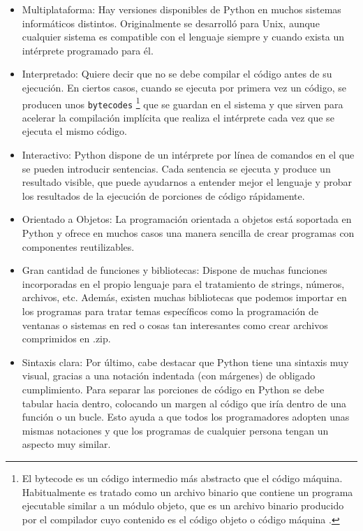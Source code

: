 \documentclass[a4paper, 12pt]{book}
\begin{document}
\begin{itemize}
\item Multiplataforma: Hay versiones disponibles de Python en muchos sistemas informáticos distintos. Originalmente se desarrolló para Unix, aunque cualquier sistema es compatible con el lenguaje siempre y cuando exista un intérprete programado para él.

\item Interpretado: Quiere decir que no se debe compilar el código antes de su ejecución. En ciertos casos, cuando se ejecuta por primera vez un código, se producen unos \texttt{bytecodes} 
\footnote{El bytecode es un código intermedio más abstracto que el código máquina. Habitualmente es tratado como un archivo binario que contiene un programa ejecutable similar a un módulo objeto, que es un archivo binario producido por el compilador cuyo contenido es el código objeto o código máquina .} que se guardan en el sistema y que sirven para acelerar la compilación implícita que realiza el intérprete cada vez que se ejecuta el mismo código.

\item Interactivo: Python dispone de un intérprete por línea de comandos en el que se pueden introducir sentencias. Cada sentencia se ejecuta y produce un resultado visible, que puede ayudarnos a entender mejor el lenguaje y probar los resultados de la ejecución de porciones de código rápidamente.

\item Orientado a Objetos: La programación orientada a objetos está soportada en Python y ofrece en muchos casos una manera sencilla de crear programas con componentes reutilizables.

\item Gran cantidad de funciones y bibliotecas: Dispone de muchas funciones incorporadas en el propio lenguaje para el tratamiento de strings, números, archivos, etc. Además, existen muchas bibliotecas que podemos importar en los programas para tratar temas específicos como la programación de ventanas o sistemas en red o cosas tan interesantes como crear archivos comprimidos en .zip.

\item Sintaxis clara: Por último, cabe destacar que Python tiene una sintaxis muy visual, gracias a una notación indentada (con márgenes) de obligado cumplimiento. Para separar las porciones de código en Python se debe tabular hacia dentro, colocando un margen al código que iría dentro de una función o un bucle. Esto ayuda a que todos los programadores adopten unas mismas notaciones y que los programas de cualquier persona tengan un aspecto muy similar.
\end{itemize}
\end{document}
